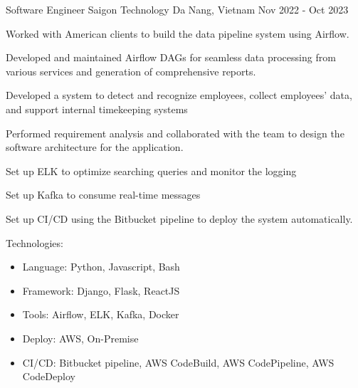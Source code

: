 

\begin{cventries}

    \cventry
    {Software Engineer} %
    {Saigon Technology} %
    {Da Nang, Vietnam} %
    {Nov 2022 - Oct 2023} %
    {
      \begin{cvitems} %
        \item {Worked with American clients to build the data pipeline system using Airflow.}
        \item {Developed and maintained Airflow DAGs for seamless data processing from various services and generation of comprehensive reports.}
        \item {Developed a system to detect and recognize employees, collect employees' data, and support internal timekeeping systems}
        \item {Performed requirement analysis and collaborated with the team to design the software architecture for the application.}
        \item {Set up ELK to optimize searching queries and monitor the logging}
        \item {Set up Kafka to consume real-time messages}
        \item {Set up CI/CD using the Bitbucket pipeline to deploy the system automatically.}
        \item {Technologies:
          \begin{itemize}
            \item {Language: Python, Javascript, Bash}
            \item {Framework: Django, Flask, ReactJS}
            \item {Tools: Airflow, ELK, Kafka, Docker}
            \item {Deploy: AWS, On-Premise}
            \item {CI/CD: Bitbucket pipeline, AWS CodeBuild, AWS CodePipeline, AWS CodeDeploy}
          \end{itemize}
        }
      \end{cvitems}
    }
    

\end{cventries}
